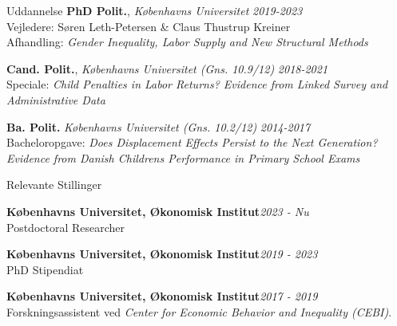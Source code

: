 \documentclass[
	11pt, %
]{resume} %
\begin{document}

\begin{rSection}{Uddannelse}
    \textbf{PhD Polit.}, \textit{Københavns Universitet} \hfill \textit{2019-2023} \\
    Vejledere: Søren Leth-Petersen \& Claus Thustrup Kreiner \\
    Afhandling: \textit{Gender Inequality, Labor Supply and New Structural Methods}

    \textbf{Cand. Polit.}, \textit{Københavns Universitet (Gns. 10.9/12)} \hfill \textit{2018-2021} \\
    Speciale: \textit{Child Penalties in Labor Returns? Evidence from Linked Survey and Administrative Data}

    \textbf{Ba. Polit.} \textit{Københavns Universitet (Gns. 10.2/12)} \hfill \textit{2014-2017} \\
    Bacheloropgave: \textit{Does Displacement Effects Persist to the Next Generation? Evidence from Danish Childrens Performance in Primary School Exams}
\end{rSection}


\begin{rSection}{Relevante Stillinger}

    \textbf{Københavns Universitet, Økonomisk Institut}\hfill \textit{2023 - Nu} \\
    Postdoctoral Researcher

    \textbf{Københavns Universitet, Økonomisk Institut}\hfill \textit{2019 - 2023} \\
    PhD Stipendiat

    \textbf{Københavns Universitet, Økonomisk Institut}\hfill \textit{2017 - 2019} \\
    Forskningsassistent ved \textit{Center for Economic Behavior and Inequality (CEBI)}.

\end{rSection}

\end{document}
